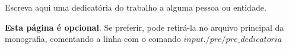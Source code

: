 \begin{dedicatoria}
Escreva aqui uma dedicatória do trabalho a alguma pessoa ou entidade.

\textbf{Esta página é opcional}. Se preferir, pode retirá-la no arquivo principal da monografia, comentando a linha com o comando $input{./pre/pre\_dedicatoria}$

\end{dedicatoria}